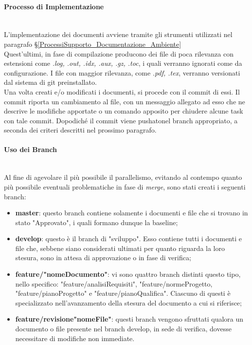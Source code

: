 
\paragraph{Processo di Implementazione} \-\\
L'implementazione dei documenti avviene tramite gli strumenti utilizzati nel paragrafo §\ref{ProcessiSupporto_Documentazione_Ambiente}\\
Quest'ultimi, in fase di compilazione producono dei file di poca rilevanza con estensioni come \textit{.log, .out, .idx, .aux, .gz, .toc}, i quali verranno ignorati come da configurazione. I file con maggior rilevanza, come \textit{.pdf, .tex}, verranno versionati dal sistema di git preinstallato. \\
Una volta creati e/o modificati i documenti, si procede con il commit di essi. Il commit riporta un cambiamento al file, con un messaggio allegato ad esso che ne
descrive le modifiche apportate o un comando apposito per chiudere alcune task con tale commit. Dopodiché il commit viene pushato\glossario nel branch appropriato, a seconda dei criteri descritti nel prossimo paragrafo.

\paragraph{Uso dei Branch} ~\\
Al fine di agevolare il più possibile il parallelismo, evitando al contempo quanto più possibile eventuali problematiche in fase di \textit{merge}\glossario, sono stati creati i seguenti branch\glossario:
\begin{itemize}
	\item \textbf{master}: questo branch contiene solamente i documenti e file che si trovano in stato "Approvato", i quali formano dunque la baseline\glossario;
	\item \textbf{develop}: questo è il branch di "sviluppo". Esso contiene tutti i documenti e file che, sebbene siano considerati ultimati per quanto riguarda la loro stesura, sono in attesa di approvazione o in fase di verifica;
	\item \textbf{feature/"nomeDocumento"}: vi sono quattro branch distinti questo tipo, nello specifico: "feature/analisiRequisiti", "feature/normeProgetto, "feature/pianoProgetto" e "feature/pianoQualifica". Ciascuno di questi è specializzato nell'avanzamento della stesura del documento a cui si riferisce;
	\item \textbf{feature/revisione"nomeFile"}: questi branch vengono sfruttati qualora un documento o file presente nel branch develop, in sede di verifica, dovesse necessitare di modifiche non immediate.
\end{itemize}

